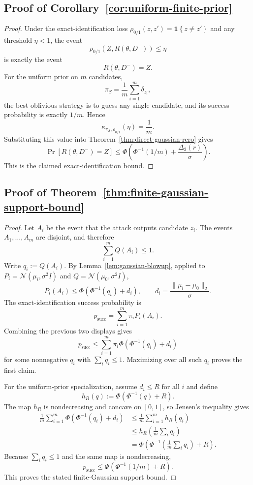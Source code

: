 \documentclass[11pt,a4paper]{report}
\theoremstyle{plain}
\theoremstyle{definition}
\theoremstyle{remark}
\newcommand{\ind}[1]{\mathbf{1}\!\left\{#1\right\}}
\begin{document}
\subsection{Proof of Corollary~\ref{cor:uniform-finite-prior}}

\begin{proof}
Under the exact-identification loss $\rho_{0/1}(z,z')=\ind{z\neq z'}$ and any threshold $\eta<1$, the event
\[
\rho_{0/1}(Z,R(\theta,D^-))\le \eta
\]
is exactly the event
\[
R(\theta,D^-)=Z.
\]
For the uniform prior on $m$ candidates,
\[
\pi_S=\frac{1}{m}\sum_{i=1}^m \delta_{z_i},
\]
the best oblivious strategy is to guess any single candidate, and its success probability is exactly $1/m$. Hence
\[
\kappa_{\pi_S,\rho_{0/1}}(\eta)=\frac{1}{m}.
\]
Substituting this value into Theorem~\ref{thm:direct-gaussian-rero} gives
\[
\Pr[R(\theta,D^-)=Z]
\le
\Phi\!\left(\Phi^{-1}(1/m)+\frac{\Delta_2(r)}{\sigma}\right).
\]
This is the claimed exact-identification bound.
\end{proof}

\subsection{Proof of Theorem~\ref{thm:finite-gaussian-support-bound}}

\begin{proof}
Let $A_i$ be the event that the attack outputs candidate $z_i$. The events $A_1,\ldots,A_m$ are disjoint, and therefore
\[
\sum_{i=1}^m Q(A_i)\le 1.
\]
Write $q_i:=Q(A_i)$. By Lemma~\ref{lem:gaussian-blowup}, applied to $P_i=\mathcal N(\mu_i,\sigma^2 I)$ and $Q=\mathcal N(\mu_0,\sigma^2 I)$,
\[
P_i(A_i)\le \Phi\!\left(\Phi^{-1}(q_i)+d_i\right),
\qquad
 d_i=\frac{\|\mu_i-\mu_0\|_2}{\sigma}.
\]
The exact-identification success probability is
\[
p_{\mathrm{succ}}=\sum_{i=1}^m \pi_i P_i(A_i).
\]
Combining the previous two displays gives
\[
p_{\mathrm{succ}}
\le
\sum_{i=1}^m \pi_i\Phi\!\left(\Phi^{-1}(q_i)+d_i\right)
\]
for some nonnegative $q_i$ with $\sum_i q_i\le 1$. Maximizing over all such $q_i$ proves the first claim.

For the uniform-prior specialization, assume $d_i\le R$ for all $i$ and
define
\[
h_R(q):=\Phi\!\left(\Phi^{-1}(q)+R\right).
\]
The map $h_R$ is nondecreasing and concave on $[0,1]$, so Jensen's
inequality gives
\[
\begin{aligned}
\frac{1}{m}\sum_{i=1}^m
\Phi\!\left(\Phi^{-1}(q_i)+d_i\right)
&\le
\frac{1}{m}\sum_{i=1}^m h_R(q_i) \\
&\le
h_R\!\left(\frac{1}{m}\sum_i q_i\right) \\
&=
\Phi\!\left(
\Phi^{-1}\!\left(\frac{1}{m}\sum_i q_i\right)+R
\right).
\end{aligned}
\]
Because $\sum_i q_i\le 1$ and the same map is nondecreasing,
\[
p_{\mathrm{succ}}
\le
\Phi\!\left(\Phi^{-1}(1/m)+R\right).
\]
This proves the stated finite-Gaussian support bound.
\end{proof}
\end{document}
